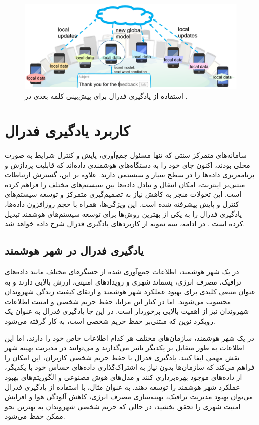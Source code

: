  \begin{figure}[t]
	\centering
	\includegraphics[scale=1]{images/chap1/gboard.png}%
	\caption{%
استفاده از یادگیری فدرال برای پیش‌بینی کلمه بعدی در
		\cite{li2020federated}%
		.
	}
	\label{gboard}
	\centering
\end{figure}



\section{کاربرد یادگیری فدرال}
سامانه‌های متمرکز سنتی که تنها مسئول جمع‌آوری، پایش و کنترل شرایط به صورت محلی بودند، اکنون جای خود را به دستگاه‌های هوشمندی داده‌اند که قابلیت پردازش و برنامه‌ریزی داده‌ها را در سطح سیار و سیستمی دارند. علاوه بر این، گسترش ارتباطات مبتنی‌بر اینترنت، امکان انتقال و تبادل داده‌ها بین سیستم‌های مختلف را فراهم کرده است. این تحولات منجر به کاهش نیاز به تصمیم‌گیری متمرکز و توسعه سیستم‌های کنترل و پایش پیشرفته شده است. این ویژگی‌ها، همراه با حجم روزافزون داده‌ها، یادگیری فدرال را به یکی از بهترین روش‌ها برای توسعه سیستم‌های هوشمند تبدیل کرده است
\cite{mahtab2022algorithm}.
در ادامه، سه نمونه از کاربردهای یادگیری فدرال شرح داده خواهد شد.


\subsection{
	یادگیری فدرال در شهر هوشمند%
}
در یک شهر هوشمند، اطلاعات جمع‌آوری شده از حسگرهای مختلف مانند داده‌های ترافیک، مصرف انرژی، پسماند شهری و رویدادهای امنیتی، ارزش بالایی دارند و به عنوان منبعی کلیدی برای بهبود عملکرد شهر هوشمند و ارتقای کیفیت زندگی شهروندان محسوب می‌شوند. اما در کنار این مزایا، حفظ حریم شخصی و امنیت اطلاعات شهروندان نیز از اهمیت بالایی برخوردار است. در این جا یادگیری فدرال به عنوان یک رویکرد نوین که مبتنی‌بر حفظ حریم شخصی است، به کار گرفته می‌شود.

در یک شهر هوشمند، سازمان‌های مختلف هر کدام اطلاعات خاص خود را دارند، اما این اطلاعات به طور متقابل بر یکدیگر تأثیر می‌گذارند و می‌توانند در مدیریت بهینه شهر نقش مهمی ایفا کنند. یادگیری فدرال با حفظ حریم شخصی کاربران، این امکان را فراهم می‌کند که سازمان‌ها بدون نیاز به اشتراک‌گذاری داده‌های حساس خود با یکدیگر، از داده‌های موجود بهره‌برداری کنند و مدل‌های هوش مصنوعی و الگوریتم‌های بهبود عملکرد شهر هوشمند را توسعه دهند. به عنوان مثال، با استفاده از یادگیری فدرال می‌توان بهبود مدیریت ترافیک، بهینه‌سازی مصرف انرژی، کاهش آلودگی هوا و افزایش امنیت شهری را تحقق بخشید، در حالی که حریم شخصی شهروندان به بهترین نحو ممکن حفظ می‌شود.


